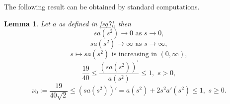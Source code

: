 \documentclass[11pt,leqno]{amsart}
\newtheorem{lemma}[theorem]{Lemma}
\begin{document}
The following result can be obtained by standard computations.
\begin{lemma}\label{cond.as} Let $a$ as defined in \eqref{eq7}, then
	 \begin{equation}\label{i}
	 	s a(s^2) \rightarrow 0 \mbox{ as } s \rightarrow 0, 
	 \end{equation}		\begin{equation}\label{ii}
	s a(s^2) \rightarrow \infty \mbox{ as } s \rightarrow \infty,
	\end{equation}
	\begin{equation}\label{iii}
	s \mapsto sa(s^2) \mbox{ is increasing in } (0, \infty),
	\end{equation} 
		\begin{equation}\label{iv}
		\frac{19}{40} \leq \frac{(s a(s^2))^{\prime}}{a(s^2)} \leq 1, \,\, s>0,
		\end{equation}
		\begin{equation}\label{radial}
		\nu_0:=\frac{19}{40\sqrt2}\le (s a(s^2))'=a(s^2)+2s^2a'(s^2)\le 1, \,\, s\ge0.
		\end{equation}
\end{lemma}
\end{document}
